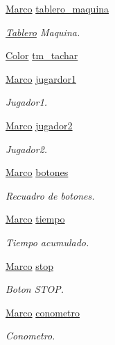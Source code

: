 \begin{CompactItemize}
\hyperlink{class_marco}{Marco} \hyperlink{class_config_22f99a51ac181a6079c67e4a9074576b}{tablero\_\-maquina}
\begin{CompactList}\small\item\em \hyperlink{class_tablero}{Tablero} Maquina. \item\end{CompactList}\item 
\hyperlink{struct_color}{Color} \hyperlink{class_config_3c9384bbc30ffeb40fa83a79b96c45fd}{tm\_\-tachar}
\item 
\hyperlink{class_marco}{Marco} \hyperlink{class_config_37dfa4fc481f1d7096f41a6f9545d7ff}{jugardor1}
\begin{CompactList}\small\item\em Jugador1. \item\end{CompactList}\item 
\hyperlink{class_marco}{Marco} \hyperlink{class_config_915ba524a7bc39f6200c868e1229c1e2}{jugador2}
\begin{CompactList}\small\item\em Jugador2. \item\end{CompactList}\item 
\hyperlink{class_marco}{Marco} \hyperlink{class_config_47db6265e31072da47a2062fda7971e1}{botones}
\begin{CompactList}\small\item\em Recuadro de botones. \item\end{CompactList}\item 
\hyperlink{class_marco}{Marco} \hyperlink{class_config_ab38937ac969b6c7a1bb516829a4b3d7}{tiempo}
\begin{CompactList}\small\item\em Tiempo acumulado. \item\end{CompactList}\item 
\hyperlink{class_marco}{Marco} \hyperlink{class_config_ac6a9b8b0f11a7016886a6250444e950}{stop}
\begin{CompactList}\small\item\em Boton STOP. \item\end{CompactList}\item 
\hyperlink{class_marco}{Marco} \hyperlink{class_config_221e1619fe58f93b4aa3369b6388ae76}{conometro}
\begin{CompactList}\small\item\em Conometro. \item\end{CompactList}\item 

\end{CompactItemize}
